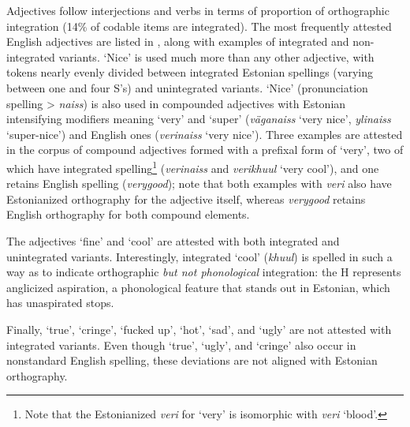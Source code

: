 \documentclass[output=paper]{langscibook}
\begin{document}
Adjectives follow interjections and verbs in terms of proportion of orthographic integration (14\% of codable items are integrated). The most frequently attested English adjectives are listed in , along with examples of integrated and non-integrated variants. ‘Nice’ is used much more than any other adjective, with tokens nearly evenly divided between integrated Estonian spellings (varying between one and four S’s) and unintegrated variants. ‘Nice’ (pronunciation spelling > \textit{naiss}) is also used in compounded adjectives with Estonian intensifying modifiers meaning ‘very’ and ‘super’ (\textit{väganaiss} ‘very nice’, \textit{ylinaiss} ‘super-nice’) and English ones (\textit{verinaiss} ‘very nice’). Three examples are attested in the corpus of compound adjectives formed with a prefixal form of ‘very’, two of which have integrated spelling\footnote{Note that the Estonianized \textit{veri} for ‘very’ is isomorphic with \textit{veri} ‘blood’.} (\textit{verinaiss} and \textit{verikhuul} ‘very cool’), and one retains English spelling (\textit{verygood}); note that both examples with \textit{veri} also have Estonianized orthography for the adjective itself, whereas \textit{verygood} retains English orthography for both compound elements.

The adjectives ‘fine’ and ‘cool’ are attested with both integrated and unintegrated variants. Interestingly, integrated ‘cool’ (\textit{khuul}) is spelled in such a way as to indicate orthographic \textit{but not phonological} integration: the H represents anglicized aspiration, a phonological feature that stands out in Estonian, which has unaspirated stops.

Finally, ‘true’, ‘cringe’, ‘fucked up’, ‘hot’, ‘sad’, and ‘ugly’ are not attested with integrated variants. Even though ‘true’, ‘ugly’, and ‘cringe’ also occur in nonstandard English spelling, these deviations are not aligned with Estonian orthography.
\end{document}
